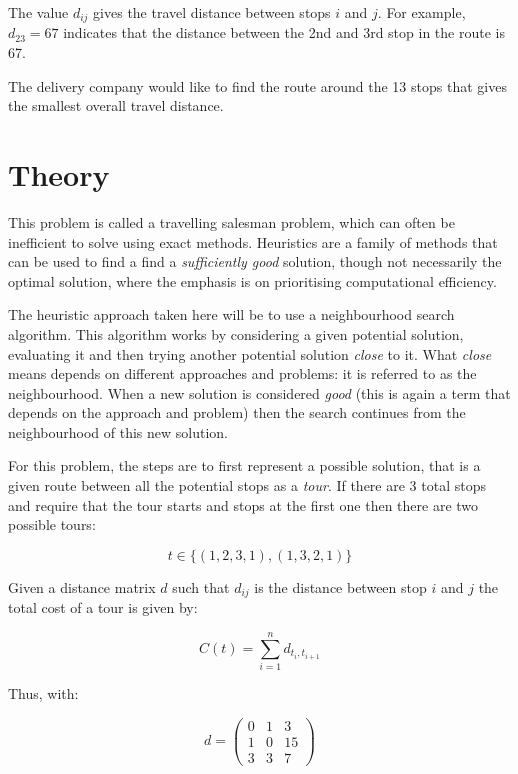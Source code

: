 The value \(d_{ij}\) gives the travel distance between
stops \(i\) and \(j\). For example, \(d_{23}=67\) %
indicates that the distance between the 2nd and 3rd stop in the route is 67. %


The delivery company would like to find the route around the 13 stops that gives
the smallest overall travel distance.


\section{Theory}\label{sec:heuristics_theory}

This problem is called a travelling salesman problem, which can
often be inefficient to solve using exact
methods\autocite{michalewicz2013solve}.
Heuristics are a family of methods that can be used to find a find a
\emph{sufficiently good} solution, though not necessarily the optimal solution,
where the emphasis is on prioritising computational efficiency.

The heuristic approach taken here will be to use a neighbourhood search algorithm.
This algorithm works by considering a given potential solution, evaluating it
and then trying another potential solution \emph{close} to it. What \emph{close}
means depends on different approaches and problems: it is referred to as the
neighbourhood. When a new solution is considered \emph{good} (this is
again a term that depends on the approach and problem) then the search
continues from the neighbourhood of this new solution.

For this problem, the steps are to first represent a possible solution, that is a given route
between all the potential stops as a \emph{tour}. If there are 3 total stops
and require that the tour starts and stops at the first one then there are two
possible tours:

\[
    t \in \{(1, 2, 3, 1), (1, 3, 2, 1)\}
\]

Given a distance matrix \(d\) such that \(d_{ij}\) is the distance between stop
\(i\) and \(j\) the total cost of a tour is given by:

\[
    C(t)=\sum_{i=1}^{n} d_{t_i, t_{i + 1}}
\]

Thus, with:

\[
    d = \begin{pmatrix}
        0 & 1 & 3\\
        1 & 0 & 15\\
        3 & 3 & 7
        \end{pmatrix}
\]

